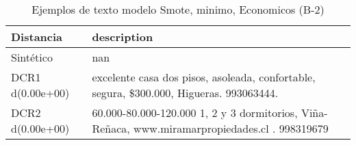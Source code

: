\begin{table}[H]
\centering
\fontsize{10}{14}\selectfont
\caption{Ejemplos de texto modelo Smote, minimo, Economicos (B-2)}
\label{table-example-economicos-b-2-smote-enc-min-text}
\begin{tabular}{|l|m{35em}|}
\hline
\rowcolor[gray]{0.8}
Distancia & description \\
\hline Sintético & nan \\
\hline DCR1 d(0.00e+00) & excelente casa dos pisos, asoleada, confortable, segura, \$300.000, Higueras. 993063444. \\
\hline DCR2 d(0.00e+00) & 60.000-80.000-120.000 1, 2 y 3 dormitorios, Vi\~na-Re\~naca, www.miramarpropiedades.cl . 998319679 \\
\hline
\end{tabular}
\end{table}
